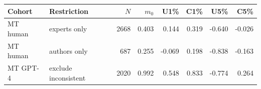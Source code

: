 \begin{tabular}{llrrrrrr}
\toprule
Cohort & Restriction & $N$ & $m_0$ & U1\% & C1\% & U5\% & C5\% \\
\midrule
MT human & experts only & 2668 & 0.403 & 0.144 & 0.319 & -0.640 & -0.026 \\
MT human & authors only & 687 & 0.255 & -0.069 & 0.198 & -0.838 & -0.163 \\
MT GPT-4 & exclude inconsistent & 2020 & 0.992 & 0.548 & 0.833 & -0.774 & 0.264 \\
\bottomrule
\end{tabular}
